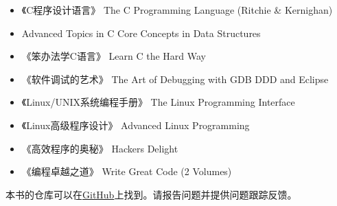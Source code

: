 \begin{itemize}
    \item 《C程序设计语言》  The C Programming Language (Ritchie \& Kernighan)
    \item Advanced Topics in C Core Concepts in Data Structures
    \item《笨办法学C语言》     Learn C the Hard Way
    \item 《软件调试的艺术》    The Art of Debugging with GDB DDD and Eclipse
    \item 《Linux/UNIX系统编程手册》    The Linux Programming Interface
    \item 《Linux高级程序设计》 Advanced Linux Programming
    \item 《高效程序的奥秘》    Hackers Delight
    \item《编程卓越之道》  Write Great Code (2 Volumes)
\end{itemize}


本书的仓库可以在\href{https://github.com/phpinternalsbook/PHP-Internals-Book}{GitHub}上找到。请报告问题并提供问题跟踪反馈。



